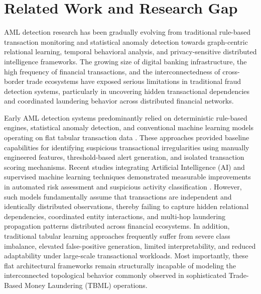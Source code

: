 \documentclass[conference]{IEEEtran}
\begin{document}
\section{\textbf{Related Work and Research Gap}}

AML detection research has been gradually evolving from traditional rule-based transaction monitoring and statistical anomaly detection towards graph-centric relational learning, temporal behavioral analysis, and privacy-sensitive distributed intelligence frameworks. The growing size of digital banking infrastructure, the high frequency of financial transactions, and the interconnectedness of cross-border trade ecosystems have exposed serious limitations in traditional fraud detection systems, particularly in uncovering hidden transactional dependencies and coordinated laundering behavior across distributed financial networks.

Early AML detection systems predominantly relied on deterministic rule-based engines, statistical anomaly detection, and conventional machine learning models operating on flat tabular transaction data \cite{jensen2023}. These approaches provided baseline capabilities for identifying suspicious transactional irregularities using manually engineered features, threshold-based alert generation, and isolated transaction scoring mechanisms. Recent studies integrating Artificial Intelligence (AI) and supervised machine learning techniques demonstrated measurable improvements in automated risk assessment and suspicious activity classification \cite{raj2024}. However, such models fundamentally assume that transactions are independent and identically distributed observations, thereby failing to capture hidden relational dependencies, coordinated entity interactions, and multi-hop laundering propagation patterns distributed across financial ecosystems. In addition, traditional tabular learning approaches frequently suffer from severe class imbalance, elevated false-positive generation, limited interpretability, and reduced adaptability under large-scale transactional workloads. Most importantly, these flat architectural frameworks remain structurally incapable of modeling the interconnected topological behavior commonly observed in sophisticated Trade-Based Money Laundering (TBML) operations.
\end{document}
